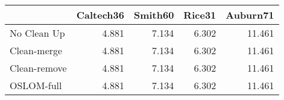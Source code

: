\begin{tabular}{lrrrr}
\toprule
{} & Caltech36 & Smith60 & Rice31 & Auburn71 \\
\midrule
No Clean Up  &     4.881 &   7.134 &  6.302 &   11.461 \\
Clean-merge  &     4.881 &   7.134 &  6.302 &   11.461 \\
Clean-remove &     4.881 &   7.134 &  6.302 &   11.461 \\
OSLOM-full   &     4.881 &   7.134 &  6.302 &   11.461 \\
\bottomrule
\end{tabular}
